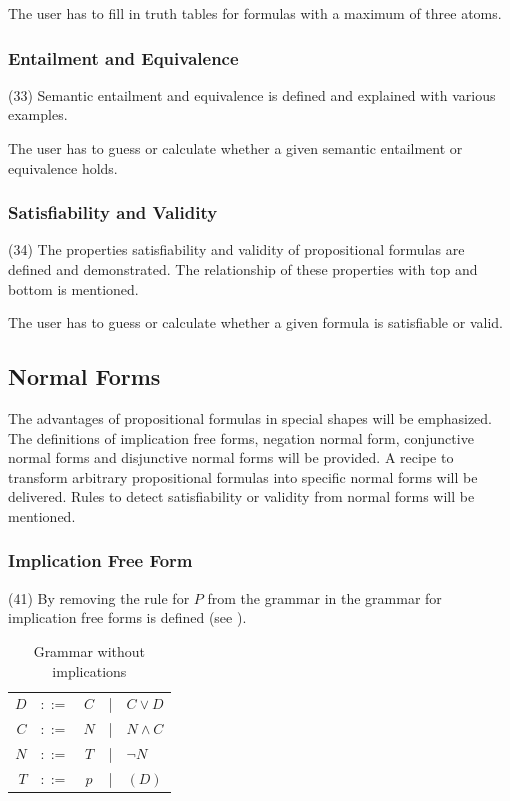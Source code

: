 The user has to fill in truth tables for formulas with a maximum of three atoms.

\subsubsection{Entailment and Equivalence}
\label{tut:33}
(33) Semantic entailment and equivalence is defined and explained with various examples.

The user has to guess or calculate whether a given semantic entailment or equivalence holds. 

\subsubsection{Satisfiability and Validity}
\label{tut:34}
(34) The properties satisfiability and validity of propositional formulas are defined and demonstrated. 
The relationship of these properties with top and bottom is mentioned. 

The user has to guess or calculate whether a given formula is satisfiable or valid.

\subsection{Normal Forms}

The advantages of propositional formulas in special shapes will be emphasized.
The definitions of implication free forms, negation normal form, 
conjunctive normal forms and disjunctive normal forms will be provided. 
A recipe to transform arbitrary propositional formulas into specific normal forms will be delivered.
Rules to detect satisfiability or validity from normal forms will be mentioned.

\subsubsection{Implication Free Form}
\label{tut:41}
(41)
By removing the rule for $P$ from the grammar in  
the grammar for implication free forms is defined  
(see ). 

\begin{table}[htdp]
\begin{center}
\begin{tabular}{rcccl}
$D$		&$::=$ & $C$ &|& $C \vee D$			\\
$C$		&$::=$ & $N$ &|& $N \wedge C$ 		\\
$N$		&$::=$ & $T$ &|& $\neg N$ 			\\
$T$		&$::=$ & $p$ &|& $(D)$
\end{tabular}
\caption{Grammar without implications}
\label{tab:BNFGRIFF}
\end{center}
\end{table}


